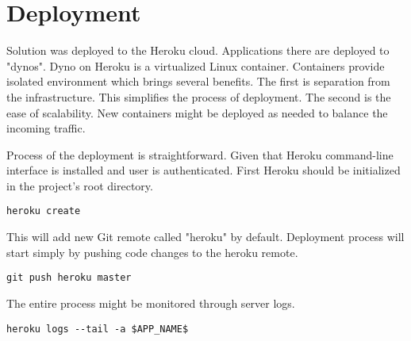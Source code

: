
\section{Deployment}\label{sec:deployment}

Solution was deployed to the Heroku cloud.\cite{heroku}
Applications there are deployed to "dynos".
Dyno on Heroku is a virtualized Linux container.
Containers provide isolated environment which brings several benefits.
The first is separation from the infrastructure.
This simplifies the process of deployment.
The second is the ease of scalability.
New containers might be deployed as needed to balance the incoming traffic.

Process of the deployment is straightforward.
Given that Heroku command-line interface is installed and user is authenticated.
First Heroku should be initialized in the project's root directory\@.

\begin{Verbatim}[frame=single]
heroku create
\end{Verbatim}

This will add new Git remote called "heroku" by default.
Deployment process will start simply by pushing code changes to the heroku remote.

\begin{Verbatim}[frame=single]
git push heroku master
\end{Verbatim}

The entire process might be monitored through server logs.

\begin{Verbatim}[frame=single]
heroku logs --tail -a $APP_NAME$
\end{Verbatim}